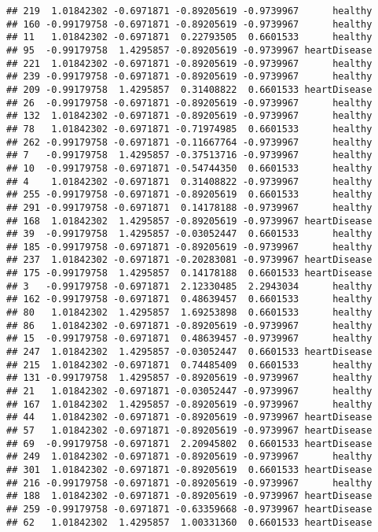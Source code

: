 \documentclass[
]{article}
\begin{document}
\begin{verbatim}
## 219  1.01842302 -0.6971871 -0.89205619 -0.9739967      healthy
## 160 -0.99179758 -0.6971871 -0.89205619 -0.9739967      healthy
## 11   1.01842302 -0.6971871  0.22793505  0.6601533      healthy
## 95  -0.99179758  1.4295857 -0.89205619 -0.9739967 heartDisease
## 221  1.01842302 -0.6971871 -0.89205619 -0.9739967      healthy
## 239 -0.99179758 -0.6971871 -0.89205619 -0.9739967      healthy
## 209 -0.99179758  1.4295857  0.31408822  0.6601533 heartDisease
## 26  -0.99179758 -0.6971871 -0.89205619 -0.9739967      healthy
## 132  1.01842302 -0.6971871 -0.89205619 -0.9739967      healthy
## 78   1.01842302 -0.6971871 -0.71974985  0.6601533      healthy
## 262 -0.99179758 -0.6971871 -0.11667764 -0.9739967      healthy
## 7   -0.99179758  1.4295857 -0.37513716 -0.9739967      healthy
## 10  -0.99179758 -0.6971871 -0.54744350  0.6601533      healthy
## 4    1.01842302 -0.6971871  0.31408822 -0.9739967      healthy
## 255 -0.99179758 -0.6971871 -0.89205619  0.6601533      healthy
## 291 -0.99179758 -0.6971871  0.14178188 -0.9739967      healthy
## 168  1.01842302  1.4295857 -0.89205619 -0.9739967 heartDisease
## 39  -0.99179758  1.4295857 -0.03052447  0.6601533      healthy
## 185 -0.99179758 -0.6971871 -0.89205619 -0.9739967      healthy
## 237  1.01842302 -0.6971871 -0.20283081 -0.9739967 heartDisease
## 175 -0.99179758  1.4295857  0.14178188  0.6601533 heartDisease
## 3   -0.99179758 -0.6971871  2.12330485  2.2943034      healthy
## 162 -0.99179758 -0.6971871  0.48639457  0.6601533      healthy
## 80   1.01842302  1.4295857  1.69253898  0.6601533      healthy
## 86   1.01842302 -0.6971871 -0.89205619 -0.9739967      healthy
## 15  -0.99179758 -0.6971871  0.48639457 -0.9739967      healthy
## 247  1.01842302  1.4295857 -0.03052447  0.6601533 heartDisease
## 215  1.01842302 -0.6971871  0.74485409  0.6601533      healthy
## 131 -0.99179758  1.4295857 -0.89205619 -0.9739967      healthy
## 21   1.01842302 -0.6971871 -0.03052447 -0.9739967      healthy
## 167  1.01842302  1.4295857 -0.89205619 -0.9739967      healthy
## 44   1.01842302 -0.6971871 -0.89205619 -0.9739967 heartDisease
## 57   1.01842302 -0.6971871 -0.89205619 -0.9739967 heartDisease
## 69  -0.99179758 -0.6971871  2.20945802  0.6601533 heartDisease
## 249  1.01842302 -0.6971871 -0.89205619 -0.9739967      healthy
## 301  1.01842302 -0.6971871 -0.89205619  0.6601533 heartDisease
## 216 -0.99179758 -0.6971871 -0.89205619 -0.9739967      healthy
## 188  1.01842302 -0.6971871 -0.89205619 -0.9739967 heartDisease
## 259 -0.99179758 -0.6971871 -0.63359668 -0.9739967 heartDisease
## 62   1.01842302  1.4295857  1.00331360  0.6601533 heartDisease

\end{verbatim}
\end{document}
